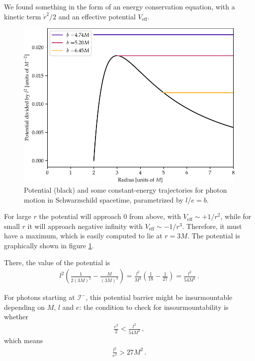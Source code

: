 \documentclass[main.tex]{subfiles}
\begin{document}
We found something in the form of an energy conservation equation, 
with a kinetic term \(\dot{r}^2 / 2\) and an effective potential \(V _{\text{eff}}\). 

\begin{figure}[ht]
\centering
\includegraphics[width=\textwidth]{figures/effective_potential}
\caption{Potential (black) and some constant-energy trajectories for photon motion in Schwarzschild spacetime, parametrized by \(l/e = b\). }
\label{fig:effective_potential}
\end{figure}
    

For large \(r\) the potential will approach 0 from above, with \( V _{\text{eff}} \sim + 1/r^2\), 
while for small \(r\) it will approach negative infinity with \( V _{\text{eff}} \sim - 1/ r^3\).
Therefore, it must have a maximum, which is easily computed to lie at \(r = 3M\). 
The potential is graphically shown in figure \ref{fig:effective_potential}.

There, the value of the potential is
%
\begin{align}
l^2 \left( \frac{1}{2 (3M)^2} - \frac{M}{(3M)^3}\right) 
= \frac{l^2}{M^2} \left( \frac{1}{18} - \frac{1}{27} \right) = \frac{l^2}{54M^2}
\,.
\end{align}
%

For photons starting at \(\mathscr{I}^-\), 
this potential barrier might be insurmountable depending on \(M\), \(l\) and \(e\): 
the condition to check for insourmountability is whether 
%
\begin{align}
\frac{e^2}{2} < \frac{l^2}{54 M^2}
\,,
\end{align}
%
which means %
\begin{align}
\frac{l^2}{e^2} > 27M^2
\,.
\end{align}
\end{document}
